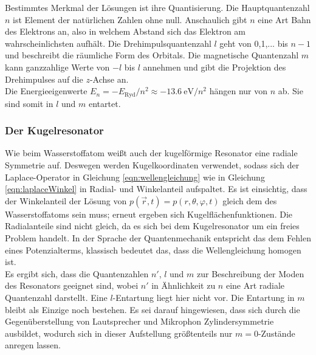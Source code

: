 Bestimmtes Merkmal der Lösungen ist ihre Quantisierung. Die Hauptquantenzahl $n$ ist Element der natürlichen Zahlen ohne null. Anschaulich gibt $n$ eine Art Bahn des Elektrons an, also in welchem Abstand sich das Elektron am wahrscheinlichsten aufhält. Die Drehimpulsquantenzahl $l$ geht von 0,1,... bis $n-1$ und beschreibt die räumliche Form des Orbitals. Die magnetische Quantenzahl $m$ kann ganzzahlige Werte von $-l$ bis $l$ annehmen und gibt die Projektion des Drehimpulses auf die $z$-Achse an.\\
Die Energieeigenwerte $E_n = -E_{\text{Ryd}}/n^2 \approx -\SI{13.6}{\electronvolt}/n^2$ hängen nur von $n$ ab. Sie sind somit in $l$ und $m$ entartet.

\subsubsection{Der Kugelresonator}
\label{subsubsec:kugelresonator}
Wie beim Wasserstoffatom weißt auch der kugelförmige Resonator eine radiale Symmetrie auf. Deswegen werden Kugelkoordinaten verwendet, sodass sich der Laplace-Operator in Gleichung \eqref{eqn:wellengleichung} wie in Gleichung \eqref{eqn:laplaceWinkel} in Radial- und Winkelanteil aufspaltet. Es ist einsichtig, dass der Winkelanteil der Lösung von $p(\vec{r}, t) = p(r,\theta,\varphi,t)$ gleich dem des Wasserstoffatoms sein muss; erneut ergeben sich Kugelflächenfunktionen. Die Radialanteile sind nicht gleich, da es sich bei dem Kugelresonator um ein freies Problem handelt. In der Sprache der Quantenmechanik entspricht das dem Fehlen eines Potenzialterms, klassisch bedeutet das, dass die Wellengleichung homogen ist.\\
Es ergibt sich, dass die Quantenzahlen $n'$, $l$ und $m$ zur Beschreibung der Moden des Resonators geeignet sind, wobei $n'$ in Ähnlichkeit zu $n$ eine Art radiale Quantenzahl darstellt. Eine $l$-Entartung liegt hier nicht vor. Die Entartung in $m$ bleibt als Einzige noch bestehen. Es sei darauf hingewiesen, dass sich durch die Gegenüberstellung von Lautsprecher und Mikrophon Zylindersymmetrie ausbildet, wodurch sich in dieser Aufstellung größtenteils nur $m=0$-Zustände anregen lassen.
